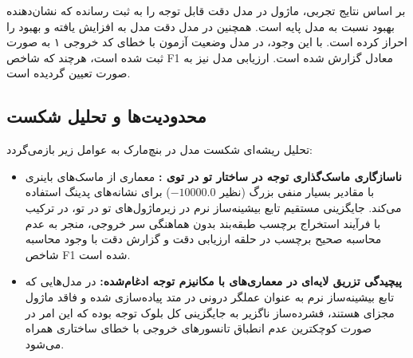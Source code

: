 بر اساس نتایج تجربی، ماژول  در مدل  دقت قابل توجه  را به ثبت رسانده که نشان‌دهنده بهبود  نسبت به مدل پایه است. همچنین در مدل  دقت مدل به  افزایش یافته و بهبود  را احراز کرده است. با این وجود، در مدل  وضعیت آزمون با خطای کد خروجی ۱ به صورت  ثبت شده است، هرچند که شاخص F1 معادل  گزارش شده است. ارزیابی مدل  نیز به صورت  تعیین گردیده است.

\subsection{محدودیت‌ها و تحلیل شکست}
تحلیل ریشه‌ای شکست مدل در بنچ‌مارک  به عوامل زیر بازمی‌گردد:
\begin{itemize}
    \item \textbf{ناسازگاری ماسک‌گذاری توجه در ساختار تو در توی :} معماری  از ماسک‌های باینری با مقادیر بسیار منفی بزرگ (نظیر $-10000.0$) برای نشانه‌های پدینگ استفاده می‌کند. جایگزینی مستقیم تابع بیشینه‌ساز نرم در زیرماژول‌های تو در تو، در ترکیب با فرآیند استخراج برچسب طبقه‌بند بدون هماهنگی سر خروجی، منجر به عدم محاسبه صحیح برچسب در حلقه ارزیابی دقت و گزارش دقت  با وجود محاسبه شاخص F1 شده است.
    \item \textbf{پیچیدگی تزریق لایه‌ای در معماری‌های با مکانیزم توجه ادغام‌شده:} در مدل‌هایی که تابع بیشینه‌ساز نرم به عنوان عملگر درونی در متد  پیاده‌سازی شده و فاقد ماژول مجزای  هستند، فشرده‌ساز ناگزیر به جایگزینی کل بلوک توجه بوده که این امر در صورت کوچکترین عدم انطباق تانسورهای خروجی با خطای ساختاری همراه می‌شود.
\end{itemize}
